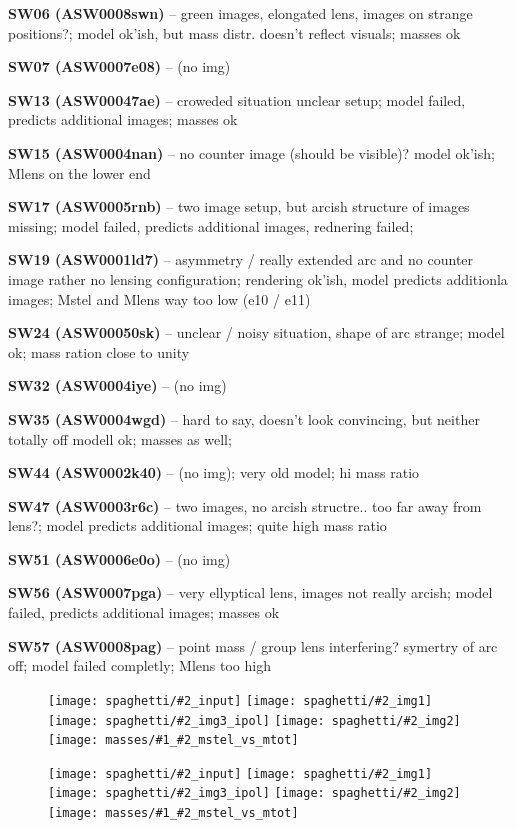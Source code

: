 \documentclass[fleqn,usenatbib]{mnras}
\newcommand{\inclfig}[2]{
  \centering
	\texttt{[image: spaghetti/\#2\_input]}%
	\texttt{[image: spaghetti/\#2\_img1]}
	\texttt{[image: spaghetti/\#2\_img3\_ipol]}%
	\texttt{[image: spaghetti/\#2\_img2]}
	\texttt{[image: masses/\#1\_\#2\_mstel\_vs\_mtot]}
}
\newcommand{\lenstitle}[1]{\noindent\textbf{#1} --}
\begin{document}
\lenstitle{SW06 (ASW0008swn)}
  green images, elongated lens, images on strange positions?;
  model ok'ish, but mass distr. doesn't reflect visuals;
  masses ok
  
\lenstitle{SW07 (ASW0007e08)} 
  (no img)
  
\lenstitle{SW13 (ASW00047ae)} 
  croweded situation unclear setup;
  model failed, predicts additional images;
  masses ok
  
\lenstitle{SW15 (ASW0004nan)} 
  no counter image (should be visible)?
  model ok'ish;
  Mlens on the lower end
  
\lenstitle{SW17 (ASW0005rnb)} 
  two image setup, but arcish structure of images missing;
  model failed, predicts additional images, rednering failed;
  
\lenstitle{SW19 (ASW0001ld7)} 
  asymmetry / really extended arc and no counter image rather no lensing configuration;
  rendering ok'ish, model predicts additionla images;
  Mstel and Mlens way too low (e10 / e11)
  
\lenstitle{SW24 (ASW00050sk)} 
  unclear / noisy situation, shape of arc strange;
  model ok;
  mass ration close to unity
  
\lenstitle{SW32 (ASW0004iye)} 
  (no img)
  
\lenstitle{SW35 (ASW0004wgd)} 
  hard to say, doesn't look convincing, but neither totally off
  modell ok;
  masses as well;
  
\lenstitle{SW44 (ASW0002k40)} 
  (no img);
  very old model;
  hi mass ratio
  
\lenstitle{SW47 (ASW0003r6c)} 
  two images, no arcish structre.. too far away from lens?;
  model predicts additional images;
  quite high mass ratio
  
\lenstitle{SW51 (ASW0006e0o)} 
  (no img)
  
\lenstitle{SW56 (ASW0007pga)} 
  very ellyptical lens, images not really arcish;
  model failed, predicts additional images;
  masses ok
  
\lenstitle{SW57 (ASW0008pag)} 
  point mass / group lens interfering? symertry of arc off;
  model failed completly;
  Mlens too high
  


\begin{figure}
	\inclfig{SW19}{ASW0001ld7_OS3CYAKLRT}
\end{figure}


\begin{figure}
	\inclfig{SW57}{ASW0008pag_5SXGXQYY6V}
\end{figure}
\end{document}
